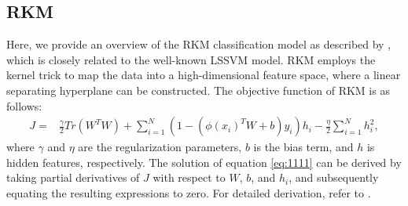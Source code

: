 \subsection{RKM}
Here, we provide an overview of the RKM classification model as described by \citet{suykens2017deep}, which is closely related to the well-known LSSVM \cite{suykens1999least} model. RKM employs the kernel trick to map the data into a high-dimensional feature space, where a linear separating hyperplane can be constructed. The objective function of RKM is as follows:
\begin{align}
\label{eq:1111}
      J = & \frac{\gamma}{2} Tr(W^TW) + \sum_{i=1}^N (1-(\phi(x_i)^TW+b)y_i)h_i - \frac{\eta}{2} \sum_{i=1}^Nh_i^2,
\end{align}
where $\gamma$ and $\eta$ are the regularization parameters, $b$ is the bias term, and $h$ is hidden features, respectively. The solution of equation \eqref{eq:1111} can be derived by taking partial derivatives of $J$ with respect to $W$, $b$, and $h_i$, and subsequently equating the resulting expressions to zero. For detailed derivation, refer to \citet{suykens2017deep}.